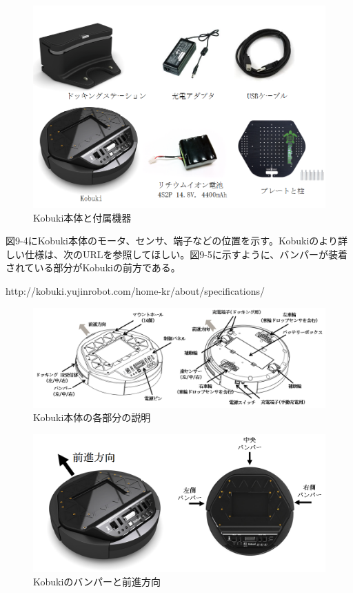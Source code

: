 \begin{figure}[ht]
  \centering
  \includegraphics[width=\columnwidth]{pictures/chapter9/pic_09_03.png}
  \caption{Kobuki本体と付属機器}
\end{figure}


図9-4にKobuki本体のモータ、センサ、端子などの位置を示す。Kobukiのより詳しい仕様は、次のURLを参照してほしい。図9-5に示すように、バンパーが装着されている部分がKobukiの前方である。

http://kobuki.yujinrobot.com/home-kr/about/specifications/

\begin{figure}[ht]
  \centering
  \includegraphics[width=\columnwidth]{pictures/chapter9/pic_09_04.png}
  \caption{Kobuki本体の各部分の説明}
\end{figure}


\begin{figure}[ht]
  \centering
  \includegraphics[width=\columnwidth]{pictures/chapter9/pic_09_05.png}
  \caption{Kobukiのバンパーと前進方向}
\end{figure}

